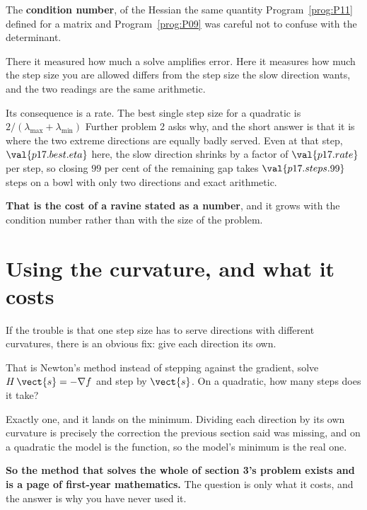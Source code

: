 \begin{fr}
\begin{ansblock}
The \textbf{condition number}, of the Hessian \dash{} the same quantity
Program~\ref{prog:P11} defined for a matrix and Program~\ref{prog:P09} was
careful not to confuse with the determinant.
\end{ansblock}

There it measured how much a solve amplifies error. Here it measures how much
the step size you are allowed differs from the step size the slow direction
wants, and the two readings are the same arithmetic.

Its consequence is a rate. The best single step size for a quadratic is
$2/(\lambda_{\max} + \lambda_{\min})$ \dash{} Further problem 2 asks why, and
the short answer is that it is where the two extreme directions are equally
badly served. Even at that step, $\val{p17.best.eta}$ here, the slow direction
shrinks by a factor of
$\val{p17.rate}$ per step, so closing $99$ per cent of the remaining gap takes
$\val{p17.steps.99}$ steps \dash{} on a bowl with only two directions and
exact arithmetic.

\textbf{That is the cost of a ravine stated as a number}, and it grows with the
condition number rather than with the size of the problem.
\end{fr}

\section{Using the curvature, and what it costs}
\label{sec:P17-newton}

\begin{fr}
If the trouble is that one step size has to serve directions with different
curvatures, there is an obvious fix: give each direction its own.

That is Newton's method \dash{} instead of stepping against the gradient,
solve $H\,\vect{s} = -\nabla f$ and step by $\vect{s}$. On a quadratic,
how many steps does it take?
\nextframe
\end{fr}

\begin{fr}
Exactly one, and it lands on the minimum. Dividing each direction by its own
curvature is precisely the correction the previous section said was missing,
and on a quadratic the model is the function, so the model's minimum is the
real one.

\textbf{So the method that solves the whole of section 3's problem exists and
is a page of first-year mathematics.} The question is only what it costs, and
the answer is why you have never used it.
\end{fr}

